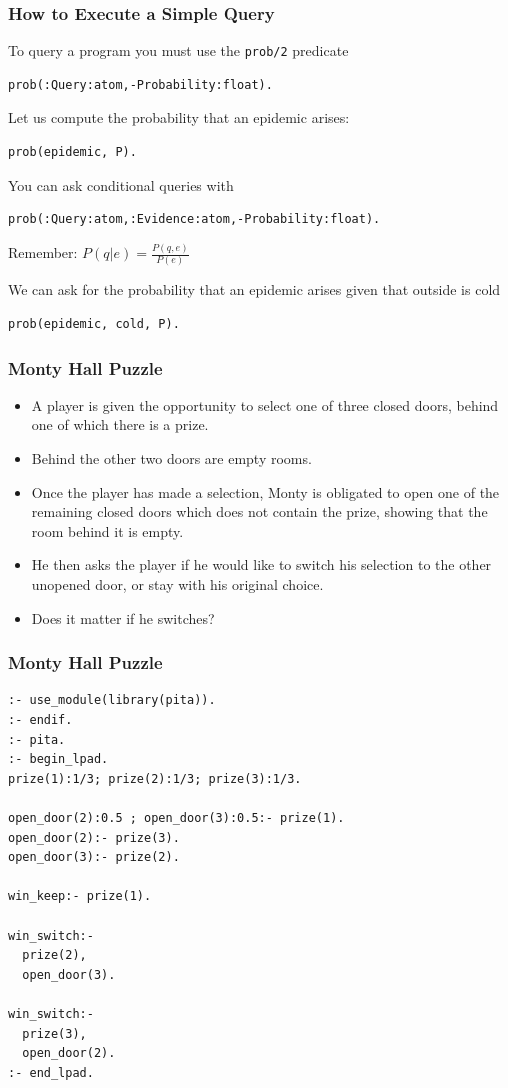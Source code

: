 \documentclass[trans]{beamer}
\begin{document}
\begin{frame}[fragile]
  \frametitle{How to Execute a Simple Query}

To query a program you must use the \verb|prob/2| predicate
\begin{verbatim}
prob(:Query:atom,-Probability:float).
\end{verbatim}
 Let us compute the probability that an epidemic arises:
\begin{verbatim}
prob(epidemic, P).
\end{verbatim}
You can ask conditional queries with 
\begin{verbatim}
prob(:Query:atom,:Evidence:atom,-Probability:float).
\end{verbatim}
Remember: $P(q|e)=\frac{P(q,e)}{P(e)}$

We can ask for the probability that an epidemic arises given that outside is cold
\begin{verbatim}
prob(epidemic, cold, P).
\end{verbatim}
\end{frame}
\begin{frame}
  \frametitle{Monty Hall Puzzle}
\begin{itemize}
\item A player is given the opportunity to
select one of three closed doors, behind one of which there is a prize.
\item Behind the other two doors are empty rooms.
\item
Once the player has made a selection, Monty is obligated to open one of the
remaining closed doors which does not contain the prize, showing that the room
behind it is empty.
\item He then asks the player if he would like to switch
his selection to the other unopened door, or stay with his original choice.
\item Does it matter if he switches?
\end{itemize}
\end{frame}
\begin{frame}[fragile]
  \frametitle{Monty Hall Puzzle}
\begin{scriptsize}
\begin{verbatim}
:- use_module(library(pita)).
:- endif.
:- pita.
:- begin_lpad.
prize(1):1/3; prize(2):1/3; prize(3):1/3.

open_door(2):0.5 ; open_door(3):0.5:- prize(1).
open_door(2):- prize(3).
open_door(3):- prize(2).

win_keep:- prize(1).

win_switch:-
  prize(2),
  open_door(3).

win_switch:-
  prize(3),
  open_door(2).
:- end_lpad.
\end{verbatim}
\end{scriptsize}
\end{frame}
\end{document}

